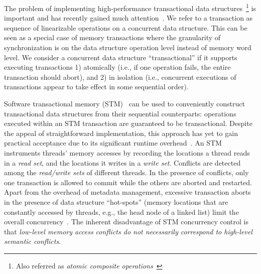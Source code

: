 \documentclass{sig-alternate-05-2015}
\begin{document}
The problem of implementing high-performance transactional data structures~\footnote{Also referred as \emph{atomic composite operations}~\cite{golan2013concurrent}} is important and has recently gained much attention~\cite{golan2013concurrent,bronson2010transactional,herlihy2008transactional,gramoli2013composing,golan2015automatic,hassan2014integrating,koskinen2010coarse}. 
We refer to a transaction as sequence of linearizable operations on a concurrent data structure.
This can be seen as a special case of memory transactions where the granularity of synchronization is on the data structure operation level instead of memory word level.
We consider a concurrent data structure ``transactional'' if it supports executing transactions 1) atomically (i.e., if one operation fails, the entire transaction should abort), and 2) in isolation (i.e., concurrent executions of transactions appear to take effect in some sequential order).

Software transactional memory (STM)~\cite{shavit1997software,herlihy2003software} can be used to conveniently construct transactional data structures from their sequential counterparts: operations executed within an STM transaction are guaranteed to be transactional.
Despite the appeal of straightforward implementation, this approach has yet to gain practical acceptance due to its significant runtime overhead~\cite{cascaval2008software}.
An STM instruments threads' memory accesses by recording the locations a thread reads in a \emph{read set}, and the locations it writes in a \emph{write set}. 
Conflicts are detected among the \emph{read/write sets} of different threads. 
In the presence of conflicts, only one transaction is allowed to commit while the others are aborted and restarted.
Apart from the overhead of metadata management, excessive transaction aborts in the presence of data structure ``hot-spots'' (memory locations that are constantly accessed by threads, e.g., the head node of a linked list) limit the overall concurrency~\cite{herlihy2008transactional}.
The inherent disadvantage of STM concurrency control is that \emph{low-level memory access conflicts do not necessarily correspond to high-level semantic conflicts}.
\end{document}
